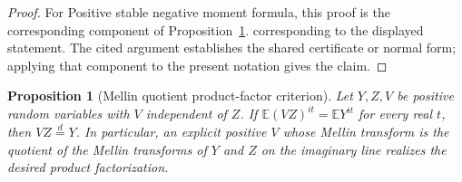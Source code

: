 \documentclass[11pt]{article}
\numberwithin{equation}{section}
\newtheorem{proposition}[theorem]{Proposition}
\theoremstyle{definition}
\theoremstyle{remark}
\newcommand{\1}{\mathbf 1}
\begin{document}
\begin{proof}
For Positive stable negative moment formula, this proof is the corresponding component of Proposition~\ref{res:mellinquotient-to-productfactor}.  corresponding to the displayed statement.  The cited argument establishes the shared certificate or normal form; applying that component to the present notation gives the claim.
\end{proof}

\begin{proposition}[Mellin quotient product-factor criterion]
\label{res:mellinquotient-to-productfactor}
Let \(Y,Z,V\) be positive random variables with \(V\) independent of \(Z\). If \(\mathbb E(VZ)^{it}=\mathbb E Y^{it}\) for every real \(t\), then \(VZ\stackrel d=Y\). In particular, an explicit positive \(V\) whose Mellin transform is the quotient of the Mellin transforms of \(Y\) and \(Z\) on the imaginary line realizes the desired product factorization.
\end{proposition}
\end{document}
